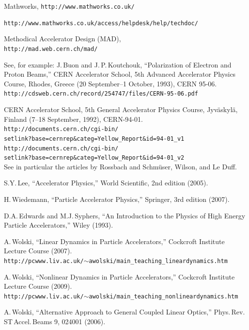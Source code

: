 \documentclass[11pt,twoside,a4paper]{article}
\begin{document}
\begin{thebibliography}{99}

Mathworks, \texttt{http://www.mathworks.co.uk/}

\texttt{http://www.mathworks.co.uk/access/helpdesk/help/techdoc/}

Methodical Accelerator Design (MAD), \\
\texttt{http://mad.web.cern.ch/mad/}

See, for example:
J.\,Buon and J.\,P.\,Koutchouk, ``Polarization of Electron and Proton Beams,''
CERN Accelerator School, 5th Advanced Accelerator Physics Course,
Rhodes, Greece (20 September--1 October, 1993), CERN 95-06. \\
\texttt{http://cdsweb.cern.ch/record/254747/files/CERN-95-06.pdf}

CERN Accelerator School, 5th General Accelerator Physics Course,
Jyv\"askyl\"a, Finland (7--18 September, 1992), CERN-94-01. \\
\texttt{http://documents.cern.ch/cgi-bin/ \\
setlink?base=cernrep\&categ=Yellow\_Report\&id=94-01\_v1} \\
\texttt{http://documents.cern.ch/cgi-bin/ \\
setlink?base=cernrep\&categ=Yellow\_Report\&id=94-01\_v2} \\
See in particular the articles by Rossbach and Schm\"user, Wilson,
and Le Duff.

S.Y.\,Lee, ``Accelerator Physics,'' World Scientific, 2nd edition (2005).

H.\,Wiedemann, ``Particle Accelerator Physics,'' Springer, 3rd edition (2007).

D.A.\,Edwards and M.J.\,Syphers, ``An Introduction to the Physics
of High Energy Particle Accelerators,'' Wiley (1993).

A.\,Wolski, ``Linear Dynamics in Particle Accelerators,''
Cockcroft Institute Lecture Course (2007). \\
\texttt{http://pcwww.liv.ac.uk/$\sim$awolski/main\_teaching\_lineardynamics.htm}

A.\,Wolski, ``Nonlinear Dynamics in Particle Accelerators,''
Cockcroft Institute Lecture Course (2009). \\
\texttt{http://pcwww.liv.ac.uk/$\sim$awolski/main\_teaching\_nonlineardynamics.htm}

A.\,Wolski, ``Alternative Approach to General Coupled Linear Optics,''
Phys.\,Rev.\,ST\,Accel.\,Beams 9, 024001 (2006).

\end{thebibliography}
\end{document}
